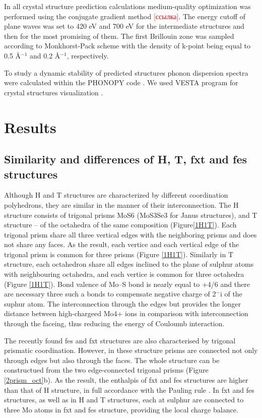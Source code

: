 \documentclass[a4paperm]{article}
\begin{document}
In all crystal structure prediction calculations medium-quality optimization was performed using the conjugate gradient method \textcolor{red}{[ссылка]}. The energy cutoff of plane waves was set to 420 eV and 700 eV for the intermediate structures and then for the most promising of them. The first Brillouin zone was sampled according to Monkhorst-Pack scheme \cite{monkhorst1976special} with the density of k-point being equal to 0.5 \AA$^{-1}$ and 0.2 \AA$^{-1}$, respectively. 


To study a dynamic stability of predicted structures phonon dispersion spectra were calculated within the PHONOPY code \cite{phonopy}. We used VESTA program for crystal structures visualization \cite{momma2011vesta}.


			\section{Results}

\subsection{Similarity and differences of H, T, fxt and fes structures}

Although H and T structures are characterized by different coordination polyhedrons, they are similar in the manner of their interconnection.
The H structure consists of trigonal prisms MoS6 (MoS3Se3 for Janus structures), and T structure – of the octahedra of the same composition (Figure\ref{1H1T}).
Each trigonal prism share all three vertical edges with the neighboring prisms and does not share any faces.
As the result, each vertice and each vertical edge of the trigonal prism is common for three prisms (Figure \ref{1H1T}).
Similarly in T structure, each octahedron share all edges inclined to the plane of sulphur atoms with neighbouring octahedra, and each vertice is common for three octahedra (Figure \ref{1H1T}).
Bond valence of Mo--S bond is nearly equal to +4/6 and there are necessary three such a bonds to compensate negative charge of 2$^-$i of the suphur atom.
The interconnection through the edges but provides the longer distance between high-chargeed Mo4+ ions in comparison with interconnection through the faceing, thus reducing the energy of Couloumb interaction.

The recently found fes and fxt structures are also characterised by trigonal prismatic coordination.
However, in these structure prisms are connected not only through edges but also through the faces.
The whole structure can be constructued from the two edge-connected trigonal prisms (Figure \ref{2prism_oct}b).
As the result, the enthalpis of fxt and fes structures are higher than that of H structure, in full accordance with the Pauling rule \cite{Pauling1929}.
In fxt and fes structures, as well as in H and T structures, each at sulphur are connected to three Mo atoms in fxt and fes structure, providing the local charge balance.
\end{document}
